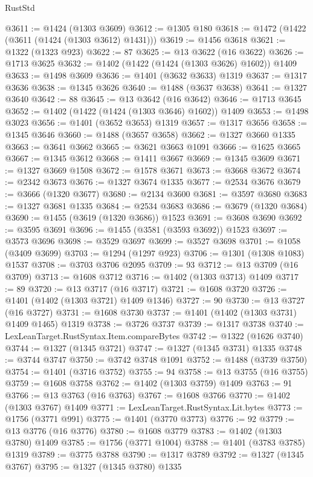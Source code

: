 \begin{lexlean}{RustStd}
\begin{coremodule}
{\begin{coremodule}
{{{{{{{{{{{{{{{{{{{{{{{{{{{{{{{{{{{{{{@3611 := @1424 (@1303 @3609)
@3612 := @1305 @180
@3618 := @1472 (@1422 (@3611 (@1424 (@1303 @3612) @1431)))
@3619 := @1456 @3618
@3621 := @1322 (@1323 @923)
@3622 := 87
@3625 := @13 @3622 (@16 @3622)
@3626 := @1713 @3625
@3632 := @1402 (@1422 (@1424 (@1303 @3626) @1602)) @1409
@3633 := @1498 @3609
@3636 := @1401 (@3632 @3633) @1319
@3637 := @1317 @3636
@3638 := @1345 @3626
@3640 := @1488 (@3637 @3638)
@3641 := @1327 @3640
@3642 := 88
@3645 := @13 @3642 (@16 @3642)
@3646 := @1713 @3645
@3652 := @1402 (@1422 (@1424 (@1303 @3646) @1602)) @1409
@3653 := @1498 @3023
@3656 := @1401 (@3652 @3653) @1319
@3657 := @1317 @3656
@3658 := @1345 @3646
@3660 := @1488 (@3657 @3658)
@3662 := @1327 @3660 @1335
@3663 := @3641 @3662
@3665 := @3621 @3663 @1091
@3666 := @1625 @3665
@3667 := @1345 @3612
@3668 := @1411 @3667
@3669 := @1345 @3609
@3671 := @1327 @3669 @1508
@3672 := @1578 @3671
@3673 := @3668 @3672
@3674 := @2342 @3673
@3676 := @1327 @3674 @1335
@3677 := @2534 @3676
@3679 := @3666 (@1320 @3677)
@3680 := @2134 @3600
@3681 := @3597 @3680
@3683 := @1327 @3681 @1335
@3684 := @2534 @3683
@3686 := @3679 (@1320 @3684)
@3690 := @1455 (@3619 (@1320 @3686)) @1523
@3691 := @3608 @3690
@3692 := @3595 @3691
@3696 := @1455 (@3581 (@3593 @3692)) @1523
@3697 := @3573 @3696
@3698 := @3529 @3697
@3699 := @3527 @3698
@3701 := @1058 (@3409 @3699)
@3703 := @1294 (@1297 @923)
@3706 := @1301 (@1308 @1083) @1537
@3708 := @3703 @3706 @2095
@3709 := 93
@3712 := @13 @3709 (@16 @3709)
@3713 := @1608 @3712
@3716 := @1402 (@1303 @3713) @1409
@3717 := 89
@3720 := @13 @3717 (@16 @3717)
@3721 := @1608 @3720
@3726 := @1401 (@1402 (@1303 @3721) @1409 @1346)
@3727 := 90
@3730 := @13 @3727 (@16 @3727)
@3731 := @1608 @3730
@3737 := @1401 (@1402 (@1303 @3731) @1409 @1465) @1319
@3738 := @3726 @3737
@3739 := @1317 @3738
@3740 := LexLeanTarget.RustSyntax.Item.compareBytes
@3742 := @1322 (@1626 @3740)
@3744 := @1327 (@1345 @3721)
@3747 := @1327 (@1345 @3731) @1335
@3748 := @3744 @3747
@3750 := @3742 @3748 @1091
@3752 := @1488 (@3739 @3750)
@3754 := @1401 (@3716 @3752)
@3755 := 94
@3758 := @13 @3755 (@16 @3755)
@3759 := @1608 @3758
@3762 := @1402 (@1303 @3759) @1409
@3763 := 91
@3766 := @13 @3763 (@16 @3763)
@3767 := @1608 @3766
@3770 := @1402 (@1303 @3767) @1409
@3771 := LexLeanTarget.RustSyntax.Lit.bytes
@3773 := @1756 (@3771 @991)
@3775 := @1401 (@3770 @3773)
@3776 := 92
@3779 := @13 @3776 (@16 @3776)
@3780 := @1608 @3779
@3783 := @1402 (@1303 @3780) @1409
@3785 := @1756 (@3771 @1004)
@3788 := @1401 (@3783 @3785) @1319
@3789 := @3775 @3788
@3790 := @1317 @3789
@3792 := @1327 (@1345 @3767)
@3795 := @1327 (@1345 @3780) @1335
}}}}}}}}}}}}}}}}}}}}}}}}}}}}}}}}}}}}}}
\end{coremodule}}
\end{coremodule}
\end{lexlean}
